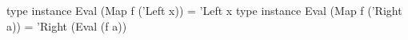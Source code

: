 \begin{code}
type instance Eval (Map f ('Left x))  = 'Left x
type instance Eval (Map f ('Right a)) = 'Right (Eval (f a))
\end{code}

